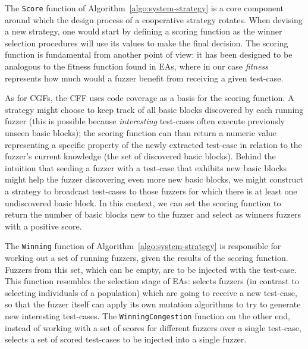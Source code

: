 The \texttt{Score} function of Algorithm~\ref{algo:system-strategy} is a core
component around which the design process of a cooperative strategy rotates.
When devising a new strategy, one would start by defining a scoring function as
the winner selection procedures will use its values to make the final decision.
The scoring function is fundamental from another point of view: it has been
designed to be analogous to the fitness function found in \acp{EA}, where in our
case \emph{fitness} represents how much would a fuzzer benefit from receiving a
given test-case.

As for \acp{CGF}, the \ac{CFF} uses code coverage as a basis for the scoring
function. A strategy might choose to keep track of all basic blocks discovered
by each running fuzzer (this is possible because \emph{interesting} test-cases
often execute previously unseen basic blocks); the scoring function can than
return a numeric value representing a specific property of the newly extracted
test-case in relation to the fuzzer's current knowledge (the set of discovered
basic blocks). Behind the intuition that seeding a fuzzer with a test-case that
exhibits new basic blocks might help the fuzzer discovering even more new basic
blocks, we might construct a strategy to broadcast test-cases to those fuzzers
for which there is at least one undiscovered basic block. In this context, we
can set the scoring function to return the number of basic blocks new to the
fuzzer and select as winners fuzzers with a positive score. %

The \texttt{Winning} function of Algorithm~\ref{algo:system-strategy} is
responsible for working out a set of running fuzzers, given the results of the
scoring function. Fuzzers from this set, which can be empty, are to be injected
with the test-case. This function resembles the selection stage of \acp{EA}:
selects fuzzers (in contrast to selecting individuals of a population) which are
going to receive a new test-case, so that the fuzzer itself can apply its own
mutation algorithms to try to generate new interesting test-cases. The
\texttt{WinningCongestion} function on the other end, instead of working with a
set of scores for different fuzzers over a single test-case, selects a set of
scored test-cases to be injected into a single fuzzer.

